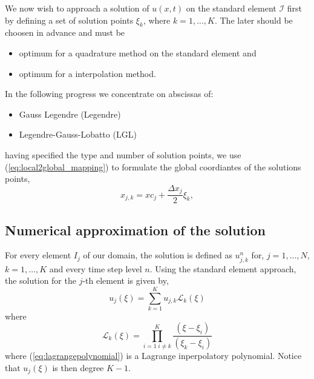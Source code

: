 	
\begin{frame} 
	We now wish to approach a solution of $u(x,t)$ on the standard element $\mathcal{I}$ first by defining a set of solution points $\xi_k$, where $k = 1,\dots,K$. The later should be choosen in advance and must be
	\begin{itemize}
	\item optimum for a quadrature method on the standard element and
	\item optimum for a interpolation method.
	\end{itemize}
	In the following progress we concentrate on abscissas of:
	\begin{itemize}
	\item Gauss Legendre (Legendre)
	\item Legendre-Gauss-Lobatto (LGL)
	\end{itemize}
	having specified the type and number of solution points, we use (\ref{eq:local2global_mapping}) to formulate the global coordiantes of the solutions points,
	\begin{equation}
	x_{j,k} = xc_j + \frac{\Delta x_j}{2} \xi_k,
	\end{equation}
\end{frame}

\subsection{Numerical approximation of the solution}

\begin{frame}
	For every element $I_j$ of our domain, the solution is defined as $u_{j,k}^n$ for, $j=1,\dots,N$, $k = 1,\dots,K$ and every time step level $n$. Using the standard element approach, the solution for the $j$-th element is given by,
	\begin{equation}
	u_{j}(\xi) = \sum_{k=1}^{K} u_{j,k} \mathcal{L}_k(\xi)
	\label{eq:u_interpolation_in_I}
	\end{equation}
	where
	\begin{equation}
	\mathcal{L}_k(\xi) = \prod_{i=1\;i\neq k}^{K} \frac{(\xi-\xi_i)}{(\xi_k-\xi_i)}
	\label{eq:lagrangepolynomial}
	\end{equation}
	where (\ref{eq:lagrangepolynomial}) is a Lagrange inperpolatory polynomial. Notice that $u_j(\xi)$ is then degree $K-1$.
\end{frame}

